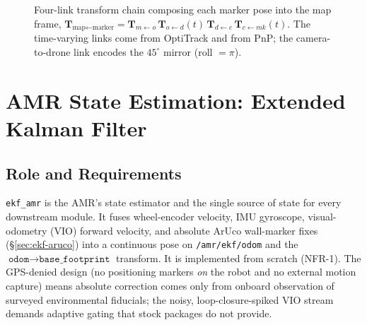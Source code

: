 \documentclass[conference]{IEEEtran}
\newcommand{\subsys}[1]{\texttt{#1}}      %
\newcommand{\Tmat}{\mathbf{T}}
\begin{document}
\begin{figure}[t]
\centering
{}
\caption{Four-link transform chain composing each marker pose into the map frame,
$\Tmat_{\text{map}\leftarrow\text{marker}}=\Tmat_{m\leftarrow o}\,
\Tmat_{o\leftarrow d}(t)\,\Tmat_{d\leftarrow c}\,\Tmat_{c\leftarrow mk}(t)$. The
time-varying links come from OptiTrack and from PnP; the camera-to-drone link
encodes the $45^\circ$ mirror (roll $=\pi$).}
\label{fig:tfchain}
\end{figure}

\section{AMR State Estimation: Extended Kalman Filter}
\label{sec:ekf}

\subsection{Role and Requirements}
\subsys{ekf\_amr} is the AMR's state estimator and the single source of state for
every downstream module. It fuses wheel-encoder velocity, IMU gyroscope,
visual-odometry (VIO) forward velocity, and absolute ArUco wall-marker fixes
(\S\ref{sec:ekf-aruco}) into a continuous pose on \texttt{/amr/ekf/odom} and the
$\texttt{odom}\to\texttt{base\_footprint}$ transform. It is implemented from
scratch (NFR-1). The GPS-denied design (no positioning markers \emph{on} the
robot and no external motion capture) means absolute correction comes only from
onboard observation of surveyed environmental fiducials; the noisy,
loop-closure-spiked VIO stream demands adaptive gating that stock packages do not
provide.
\end{document}
